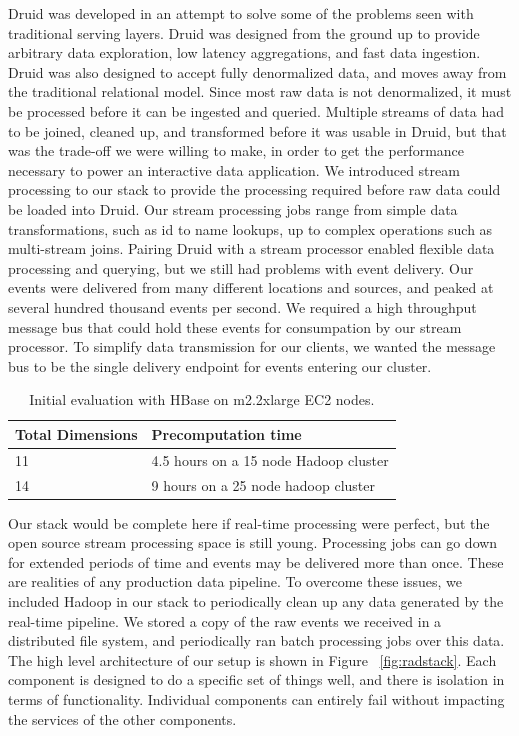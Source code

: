 \documentclass{vldb}
\begin{document}
Druid was developed in an attempt to solve some of the problems seen with
traditional serving layers. Druid was designed from the ground up to provide
arbitrary data exploration, low latency aggregations, and fast data ingestion.
Druid was also designed to accept fully denormalized data, and moves away from
the traditional relational model. Since most raw data is not denormalized,
it must be processed before it can be ingested and queried. Multiple streams of
data had to be joined, cleaned up, and transformed before it was usable in
Druid, but that was the trade-off we were willing to make,
in order to get the performance necessary to
power an interactive data application. We introduced stream processing to our
stack to provide the processing required before raw data could be loaded into
Druid. Our stream processing jobs range from simple data transformations, such
as id to name lookups, up to complex operations such as multi-stream joins.
Pairing Druid with a stream processor enabled flexible data processing and
querying, but we still had problems with event delivery.  Our events were
delivered from many different locations and sources, and peaked at several
hundred thousand events per second. We required a high throughput message bus
that could hold these events for consumpation by our stream processor.  To
simplify data transmission for our clients, we wanted the message bus to be the
single delivery endpoint for events entering our cluster.  

\begin{table}
\centering
\scriptsize\begin{tabular}{| l | l |} \hline
\textbf{Total Dimensions} & \textbf{Precomputation time} \\ \hline
  11 & 4.5 hours on a 15 node Hadoop cluster \\ \hline
  14 & 9 hours on a 25 node hadoop cluster \\ \hline
\end{tabular}
\normalsize
\caption{Initial evaluation with HBase on m2.2xlarge EC2 nodes.}
\label{tab:hbase_results}
\end{table}

Our stack would be complete here if real-time processing were perfect, but the
open source stream processing space is still young. Processing jobs can go down
for extended periods of time and events may be delivered more than once.  These
are realities of any production data pipeline. To overcome these issues, we
included Hadoop in our stack to periodically clean up any data generated by the
real-time pipeline. We stored a copy of the raw events we received in a
distributed file system, and periodically ran batch processing jobs over this
data. The high level architecture of our setup is shown in Figure
~\ref{fig:radstack}. Each component is designed to do a specific set of things
well, and there is isolation in terms of functionality. Individual components
can entirely fail without impacting the services of the other components.
\end{document}
